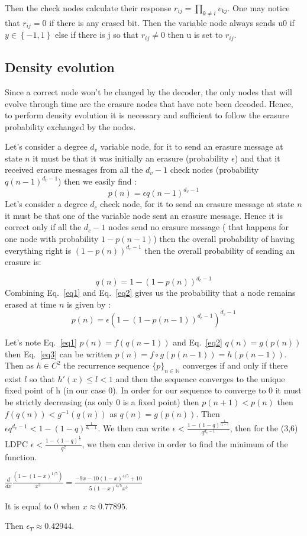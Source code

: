 \documentclass[a4paper]{article}
\begin{document}
Then the check nodes calculate their response $r_{ij}=\prod_{k \neq i}{v_{kj}}$. One may notice that $r_{ij}=0$ if there is any erased bit.
Then the variable node always sends u0 if $y \in \left\{-1,1\right\}$ else if there is j so that $r_{ij} \neq 0$ then u is set to $r_{ij}$.

\subsection{Density evolution}

Since a correct node won't be changed by the decoder, the only nodes that will evolve through time are the erasure nodes that have note been decoded. Hence, to perform density evolution it is necessary and sufficient to follow the erasure probability exchanged by the nodes.

Let's consider a degree $d_v$ variable node, for it to send an erasure message at state $n$ it must be that it was initially an erasure (probability $\epsilon$) and that it received erasure messages from all the $d_v-1$ check nodes (probability $q(n-1)^{d_v-1}$) then we easily find : 
\begin{equation}
p(n)=\epsilon q(n-1)^{d_v-1}
\label{eq1}
\end{equation}
Let's consider a degree $d_c$ check node, for it to send an erasure message at state $n$ it must be that one of the variable node sent an erasure message. Hence it is correct only if all the $d_c-1$ nodes send no erasure message ( that happens for one node with probability $1-p(n-1)$) then the overall probability of having everything right is $(1-p(n))^{d_c-1}$ then the overall probability of sending an erasure is:

\begin{equation}
q(n)= 1-(1-p(n))^{d_c-1}
\label{eq2}
\end{equation}
Combining Eq.~\ref{eq1} and Eq.~\ref{eq2} gives us the probability that a node remains erased at time $n$ is given by :
\begin{equation}
p(n)= \epsilon (1-(1-p(n-1))^{d_c-1})^{d_v-1}
\label{eq3}
\end{equation}

Let's note Eq.~\ref{eq1} $p(n)=f(q(n-1))$ and Eq.~\ref{eq2} $q(n)=g(p(n))$ then Eq.~\ref{eq3} can be written $p(n)=f \circ g(p(n-1))=h(p(n-1))$.
Then as $h\in C^2$ the recurrence sequence $\{p\}_{n\in\mathbb{N}}$ converges if and only if there exist $l$ so that $h'(x)\leq l <1$ and then the sequence converges to the unique fixed point of h (in our case 0). %
In order for our sequence to converge to 0 it must be strictly decreasing (as only 0 is a fixed point) then $p(n+1)<p(n)$ then $ f(q(n))<g^{-1}(q(n))$ as $q(n) =g(p(n))$.
Then $ \epsilon q^{d_v-1}<1-(1-q)^{\frac{1}{d_c-1}}$. 
We then can write $ \epsilon<\frac{1-(1-q)^{\frac{1}{d_c-1}}}{q^{d_v-1}}$, then for the (3,6) LDPC  $ \epsilon<\frac{1-(1-q)^{\frac{1}{5}}}{q^{2}}$, we then can derive in order to find the minimum of the function.

$\frac{d}{dx} \frac{(1-(1-x)^{1/5})}{x^2} = \frac{-9 x-10 (1-x)^{4/5}+10}{5 (1-x)^{4/5} x^3}$


It is equal to 0 when $x\approx 0.77895$.


Then $ \epsilon_T \approx 0.42944 $.
\end{document}
